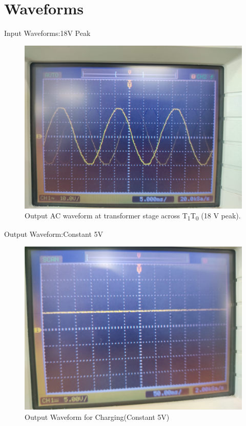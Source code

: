 \documentclass{beamer}
\begin{document}
\section{Waveforms}
\begin{frame}{Input Waveforms:18V Peak}
\begin{figure}[!ht]
    \includegraphics[width=\columnwidth]{figs/input.jpeg}
    \caption{Output AC waveform at transformer stage across T\textsubscript{1}T\textsubscript{0} (18 V peak).}
    \label{fig:transformer}
\end{figure}
\end{frame}
\begin{frame}{Output Waveform:Constant 5V}
\begin{figure}[!ht]
    \includegraphics[width=\columnwidth]{figs/output.jpeg}
	\caption{Output Waveform for Charging(Constant 5V)}
    \label{fig:transformer}
\end{figure}
\end{frame}
\end{document}
